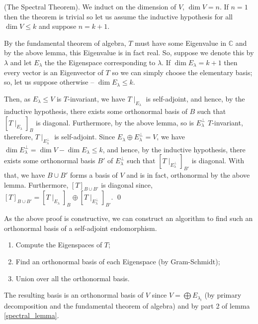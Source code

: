 \documentclass[
]{article}
\theoremstyle{definition}
\theoremstyle{definition}
\begin{document}
\proof (The Spectral Theorem). We induct on the dimension of \(V\),
\(\dim V = n\). If \(n = 1\) then the theorem is trivial so let us
assume the inductive hypothesis for all \(\dim V \le k\) and suppose
\(n = k + 1\).

By the fundamental theorem of algebra, \(T\) must have some Eigenvalue
in \(\mathbb{C}\) and by the above lemma, this Eigenvalue is in fact
real. So, suppose we denote this by \(\lambda\) and let \(E_\lambda\)
the the Eigenspace corresponding to \(\lambda\). If
\(\dim E_\lambda = k + 1\) then every vector is an Eigenvector of \(T\)
so we can simply choose the elementary basis; so, let us suppose
otherwise -- \(\dim E_\lambda \le k\).

Then, as \(E_\lambda \le V\) is \(T\)-invariant, we have
\(T \mid_{E_\lambda}\) is self-adjoint, and hence, by the inductive
hypothesis, there exists some orthonormal basis of \(B\) such that
\([T \mid_{E_\lambda}]_B\) is diagonal. Furthermore, by the above lemma,
so is \(E_\lambda^\bot\) \(T\)-invariant, therefore,
\(T \mid_{E_\lambda^\bot}\) is self-adjoint. Since
\(E_\lambda \oplus E_\lambda^\bot = V\), we have
\(\dim E_\lambda^\bot = \dim V - \dim E_\lambda \le k\), and hence, by
the inductive hypothesis, there exists some orthonormal basis \(B'\) of
\(E_\lambda^\bot\) such that \([T \mid_{E_\lambda^\bot}]_{B'}\) is
diagonal. With that, we have \(B \cup B'\) forms a basis of \(V\) and is
in fact, orthonormal by the above lemma. Furthermore,
\([T]_{B \cup B'}\) is diagonal since,
\([T]_{B \cup B'} = [T \mid_{E_\lambda}]_B \oplus [T \mid_{E_\lambda^\bot}]_{B'}\).
\qed

As the above proof is constructive, we can construct an algorithm to
find such an orthonormal basis of a self-adjoint endomorphism.

\begin{enumerate}
  \item Compute the Eigenspaces of \(T\);
  \item Find an orthonormal basis of each Eigenspace (by Gram-Schmidt);
  \item Union over all the orthonormal basis.
\end{enumerate}

The resulting basis is an orthonormal basis of \(V\) since
\(V = \bigoplus E_{\lambda_i}\) (by primary decomposition and the
fundamental theorem of algebra) and by part 2 of lemma
\ref{spectral_lemma}.
\end{document}
